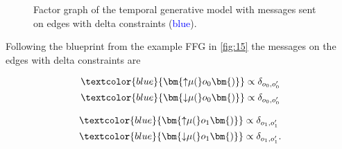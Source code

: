 \begin{figure}[htbp]

    \caption{Factor graph of the temporal generative model with messages sent on edges with delta constraints (\textcolor{blue}{blue}).}
    \label{fig:16}
\end{figure}

Following the blueprint from the example FFG in \cref{fig:15} the messages on the edges with delta constraints are

\noindent
\begin{minipage}[t]{0.5\textwidth}
    \setlength{\abovedisplayskip}{0pt}
    \setlength{\belowdisplayskip}{0pt}
    \begin{align}
        \textcolor{blue}{\bm{{\uparrow}{\mu}(}o_0\bm{)}}   & \propto \delta_{o_0,o'_0} \\
        \textcolor{blue}{\bm{{\downarrow}{\mu}(}o_0\bm{)}} & \propto \delta_{o_0,o'_0}
    \end{align}
\end{minipage}\hfill
\begin{minipage}[t]{0.5\textwidth}
    \setlength{\abovedisplayskip}{0pt}
    \setlength{\belowdisplayskip}{0pt}
    \begin{align}
        \textcolor{blue}{\bm{{\uparrow}{\mu}(}o_1\bm{)}}   & \propto \delta_{o_1,o'_1}  \\
        \textcolor{blue}{\bm{{\downarrow}{\mu}(}o_1\bm{)}} & \propto \delta_{o_1,o'_1}.
    \end{align}
\end{minipage}

